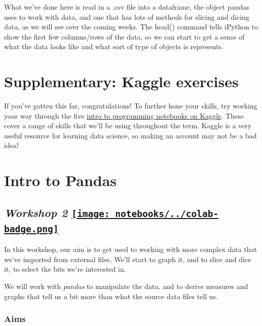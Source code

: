 \documentclass[
  letterpaper,
  DIV=11,
  numbers=noendperiod]{scrreprt}
\begin{document}
What we've done here is read in a .csv file into a dataframe, the object
pandas uses to work with data, and one that has lots of methods for
slicing and dicing data, as we will see over the coming weeks. The
head() command tells iPython to show the first few columns/rows of the
data, so we can start to get a sense of what the data looks like and
what sort of type of objects is represents.


\hypertarget{supplementary-kaggle-exercises}{%
\chapter{Supplementary: Kaggle
exercises}\label{supplementary-kaggle-exercises}}

If you've gotten this far, congratulations! To further hone your skills,
try working your way through the five
\href{https://www.kaggle.com/learn/intro-to-programming}{intro to
programming notebooks on Kaggle}. These cover a range of skills that
we'll be using throughout the term. Kaggle is a very useful resource for
learning data science, so making an account may not be a bad idea!


\hypertarget{intro-to-pandas}{%
\chapter{Intro to Pandas}\label{intro-to-pandas}}

\hypertarget{workshop-2-open-in-colab}{%
\section[\emph{Workshop 2} ]{\texorpdfstring{\emph{Workshop 2}
\href{https://colab.research.google.com/github/oballinger/QM2/blob/main/notebooks/W02.\%20Pandas.ipynb}{\protect\texttt{[image: notebooks/../colab-badge.png]}}}{Workshop 2 Open In Colab}}\label{workshop-2-open-in-colab}}

In this workshop, our aim is to get used to working with more complex
data that we've imported from external files. We'll start to graph it,
and to slice and dice it, to select the bits we're interested in.

We will work with \emph{pandas} to manipulate the data, and to derive
measures and graphs that tell us a bit more than what the source data
files tell us.

\hypertarget{aims}{%
\subsection{Aims}\label{aims}}
\end{document}
